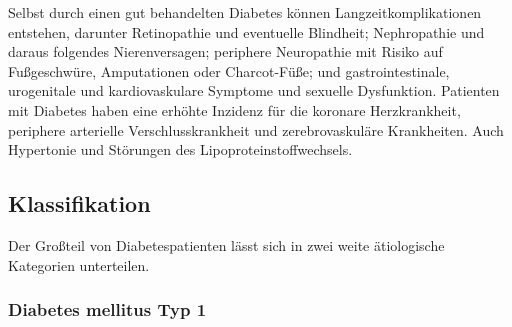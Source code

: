 \documentclass{article}
\begin{document}
Selbst durch einen gut behandelten Diabetes können Langzeitkomplikationen entstehen, darunter Retinopathie und eventuelle Blindheit; Nephropathie und daraus folgendes Nierenversagen; periphere Neuropathie mit Risiko auf Fußgeschwüre, Amputationen oder Charcot-Füße; und gastrointestinale, urogenitale und kardiovaskulare Symptome und sexuelle Dysfunktion\footnotemark[\value{footnote}]. Patienten  mit Diabetes haben eine erhöhte Inzidenz für die koronare Herzkrankheit, periphere arterielle  Verschlusskrankheit und zerebrovaskuläre Krankheiten. Auch Hypertonie und Störungen des Lipoproteinstoffwechsels\footnotemark[\value{footnote}]. \cite{ada}

\subsection{Klassifikation}

Der Großteil von Diabetespatienten lässt sich in zwei weite ätiologische Kategorien unterteilen. 

\subsubsection{Diabetes mellitus Typ 1}




\newpage

\printbibliography
\end{document}
